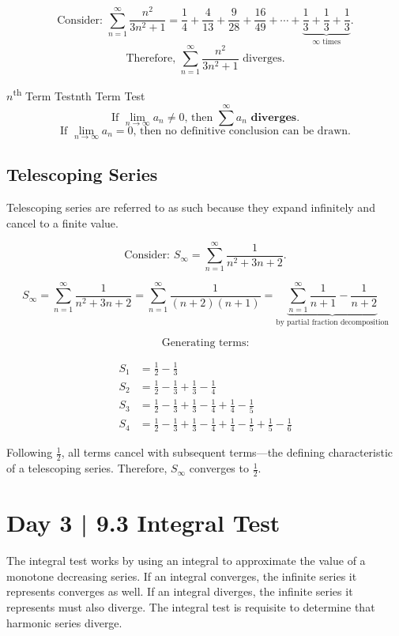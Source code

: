 \documentclass[10pt]{article}
\theoremstyle{definition}
\begin{document}
\[\text{Consider: } \sum_{n=1}^{\infty} \frac{n^2}{3n^2+1}=\frac{1}{4}+\frac{4}{13}+\frac{9}{28}+\frac{16}{49}+\cdots + \underbrace{\frac{1}{3}+\frac{1}{3}+\frac{1}{3}}_{\infty \text{ times}}.\]
\[\text{Therefore, } \sum_{n=1}^{\infty} \frac{n^2}{3n^2+1} \text{ diverges.}\]

\begin{theorem}{$n$\textsuperscript{th} Term Test}{nth Term Test}
    \[\text{If } \lim_{n \to \infty} a_n \not= 0 \text{, then } \sum^{\infty} a_n \textbf{ diverges.}\]
    \[\text{If } \lim_{n \to \infty} a_n     = 0 \text{, then no definitive conclusion can be drawn.}\]
\end{theorem}

\subsection{Telescoping Series}
Telescoping series are referred to as such because they expand infinitely and cancel to a finite value.




\[\text{Consider: } S_\infty=\sum_{n=1}^{\infty} \frac{1}{n^2+3n+2}.\]

\[S_\infty = \sum_{n=1}^{\infty} \frac{1}{n^2+3n+2} = \sum_{n=1}^{\infty} \frac{1}{(n+2)(n+1)}=\underbrace{\sum_{n=1}^{\infty} \frac{1}{n+1}-\frac{1}{n+2}}_{\text{by partial fraction decomposition}}\]


\newpage

\[\text{Generating terms:}\]

\begin{equation*}
\begin{split}
    S_1&=\frac{1}{2}-\frac{1}{3} \\
    S_2&=\frac{1}{2}-\frac{1}{3}+\frac{1}{3}-\frac{1}{4} \\
    S_3&=\frac{1}{2}-\frac{1}{3}+\frac{1}{3}-\frac{1}{4}+\frac{1}{4}-\frac{1}{5} \\
    S_4&=\frac{1}{2}-\frac{1}{3}+\frac{1}{3}-\frac{1}{4}+\frac{1}{4}-\frac{1}{5}+\frac{1}{5}-\frac{1}{6}
\end{split}
\end{equation*}

Following $\frac{1}{2}$, all terms cancel with subsequent terms---the defining characteristic of a telescoping series. Therefore, $S_\infty$ converges to $\frac{1}{2}$.



\section{Day 3 | 9.3 Integral Test}
The integral test works by using an integral to approximate the value of a monotone decreasing series. If an integral converges, the infinite series it represents converges as well. If an integral diverges, the infinite series it represents must also diverge. The integral test is requisite to determine that harmonic series diverge.
\end{document}
